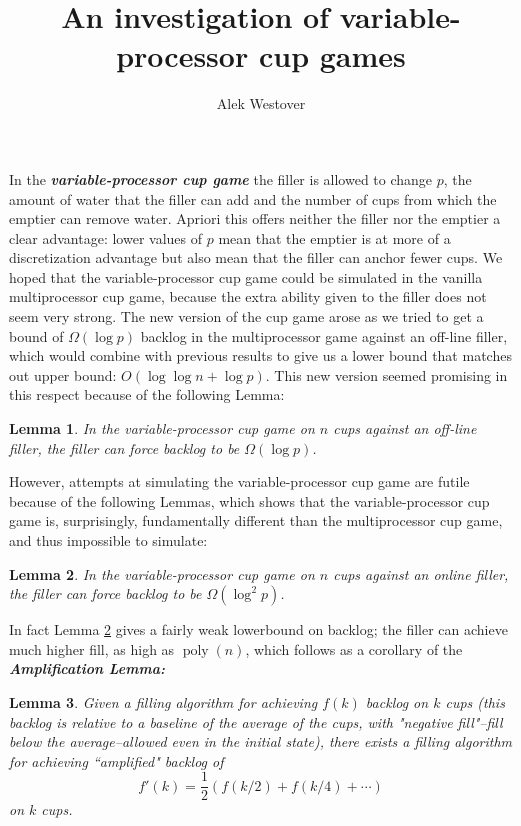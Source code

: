 \documentclass{article}[11pt]
\title{An investigation of variable-processor cup games}
\author{Alek Westover}
\newcommand{\defn}[1]{{\textit{\textbf{\boldmath #1}}}}
\DeclareMathOperator{\poly}{\text{poly}}
\newtheorem{lemma}{Lemma}
\begin{document}
\maketitle

In the \defn{variable-processor cup game} the filler is allowed to change
$p$, the amount of water that the filler can add and the number of cups from
which the emptier can remove water.  Apriori this offers neither the filler nor the emptier a clear
advantage: lower values of $p$ mean that the emptier is at more of a
discretization advantage but also mean that the filler can anchor fewer cups.
We hoped that the variable-processor cup game could be simulated in the vanilla
multiprocessor cup game, because the extra ability given to the filler does not
seem very strong. The new version of the cup game arose as we tried to get a bound 
of $\Omega(\log p)$ backlog in the multiprocessor game against an off-line filler, 
which would combine with previous results to give us a lower bound that matches
out upper bound: $O(\log\log n + \log p)$. This new version seemed promising in
this respect because of the following Lemma:

\begin{lemma}
  \label{lem:dprand}
  In the variable-processor cup game on $n$ cups against an 
  off-line filler, the filler can force backlog to be $\Omega(\log p)$.
\end{lemma}

However, attempts at simulating the variable-processor cup game are futile
because of the following Lemmas, which shows that the variable-processor cup
game is, surprisingly, fundamentally different than the multiprocessor cup game,
and thus impossible to simulate:

\begin{lemma}
  \label{lem:dpdet}
  In the variable-processor cup game on $n$ cups against an online filler, the
  filler can force backlog to be $\Omega(\log^2 p)$.
\end{lemma}

In fact Lemma \ref{lem:dpdet} gives a fairly weak lowerbound on backlog; the
filler can achieve much higher fill, as high as $\poly(n)$, which follows as a
corollary of the \defn{Amplification Lemma:}

\begin{lemma}
  \label{lem:amplification}
  Given a filling algorithm for achieving $f(k)$ backlog on $k$ cups (this
  backlog is relative to a baseline of the average of the cups, with "negative
  fill"--fill below the average--allowed even in the initial state), there
  exists a filling algorithm for achieving ``amplified" backlog of
  $$f'(k) = \frac{1}{2}(f(k/2) + f(k/4) + \cdots )$$
  on $k$ cups.
\end{lemma}
\end{document}
